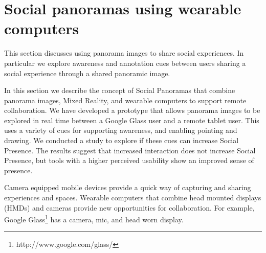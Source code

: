 \section{Social panoramas using wearable computers}

This section discusses using panorama images to share social experiences. In particular we explore awareness and annotation cues between users sharing a social experience through a shared panoramic image.







In this section we describe the concept of Social Panoramas that combine panorama images, Mixed Reality, and wearable computers to support remote collaboration. We have developed a prototype that allows panorama images to be explored in real time between a Google Glass user and a remote tablet user. This uses a variety of cues for supporting awareness, and enabling pointing and drawing. We conducted a study to explore if these cues can increase Social Presence. The results suggest that increased interaction does not increase Social Presence, but tools with a higher perceived usability show an improved sense of presence.


Camera equipped mobile devices provide a quick way of capturing and sharing experiences and spaces. Wearable
computers that combine head mounted displays (HMDs) and cameras provide new opportunities for collaboration. For example, Google Glass\footnote{http://www.google.com/glass/} has a camera, mic, and head worn display.

